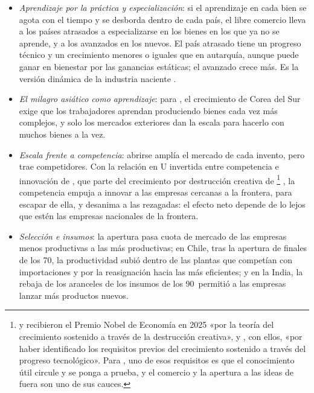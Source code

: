 \documentclass[11pt]{article}
\begin{document}
\begin{itemize}
\item \emph{Aprendizaje por la práctica y especialización}\nocite{Young1991Learning}: si el aprendizaje en cada bien se agota con el tiempo y se desborda dentro de cada país, el libre comercio lleva a los países atrasados a especializarse en los bienes en los que ya no se aprende, y a los avanzados en los nuevos. El país atrasado tiene un progreso técnico y un crecimiento menores o iguales que en autarquía, aunque puede ganar en bienestar por las ganancias estáticas; el avanzado crece más. Es la versión dinámica de la industria naciente .
\item \emph{El milagro asiático como aprendizaje}: para \textcite{Lucas1993Making}, el crecimiento de Corea del Sur exige que los trabajadores aprendan produciendo bienes cada vez más complejos, y solo los mercados exteriores dan la escala para hacerlo con muchos bienes a la vez.
\item \emph{Escala frente a competencia}: abrirse amplía el mercado de cada invento, pero trae competidores. Con la relación en U invertida entre competencia e innovación de \textcite{AghionEtAl2005}, que parte del crecimiento por destrucción creativa de \textcite{AghionHowitt1992}\footnote{ y  recibieron el Premio Nobel de Economía en 2025 «por la teoría del crecimiento sostenido a través de la destrucción creativa», y , con ellos, «por haber identificado los requisitos previos del crecimiento sostenido a través del progreso tecnológico»\nocite{NobelPrize2025}. Para , uno de esos requisitos es que el conocimiento útil circule y se ponga a prueba, y el comercio y la apertura a las ideas de fuera son uno de sus cauces.} , la competencia empuja a innovar a las empresas cercanas a la frontera, para escapar de ella, y desanima a las rezagadas: el efecto neto depende de lo lejos que estén las empresas nacionales de la frontera.
\item \emph{Selección e insumos}: la apertura pasa cuota de mercado de las empresas menos productivas a las más productivas\nocite{Melitz2003Impact}; en Chile, tras la apertura de finales de los 70, la productividad subió dentro de las plantas que competían con importaciones y por la reasignación hacia las más eficientes\nocite{Pavcnik2002Trade}; y en la India, la rebaja de los aranceles de los insumos de los 90~permitió a las empresas lanzar más productos nuevos\nocite{GoldbergEtAl2010Imported}.
\end{itemize}
\end{document}
